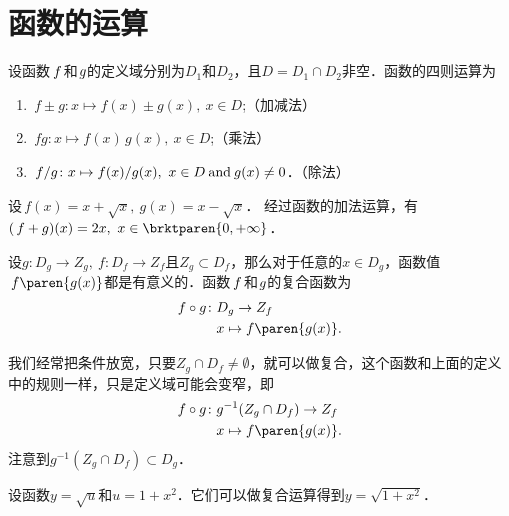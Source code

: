 \section{函数的运算\label{sec:funcops}}

\begin{definition}
  \label{defn:func4ops}
  设函数\(\,f\mkern2mu\)和\(\mkern1mu g\)的定义域分别为\(D_1\)和\(D_2\)，且\(D = D_1 \cap D_2\)非空．函数的四则运算为
  \begin{enumerate}
    \renewcommand{\labelenumi}{\enumparen{\arabic{enumi}}}
  \item \(\,f \pm g\colon x \mapsto f(x) \pm g(x),\ x \in D\);\hfill（加减法）
  \item \(\,fg\colon x \mapsto f(x) \, g(x),\ x \in D\);\hfill（乘法）
  \item \(\,f/g\colon x \mapsto f(x) / g(x),\ x \in D \mathbin{\text{and}} g(x) \ne 0\)．\hfill（除法）
  \end{enumerate}
\end{definition}

\begin{example*}
  设\(\,f(x) = x + \sqrt x,\ g(x) = x - \sqrt x\)．
  经过函数的加法运算，有\((\,f+g)(x) = 2x,\ x \in \brktparen{0, +\infty}\)．
\end{example*}

\begin{definition*}
  设\(g\colon D_g \to Z_g,\ f\colon D_f \to Z_f\)且\(Z_g \subset D_f\)，那么对于任意的\(x \in D_g\)，函数值\(\,f\paren{g(x)}\)都是有意义的．函数\(\,f\mkern2mu\)和\(\mkern1mu g\)的复合函数为
  \[
    \begin{split}
      f \circ g\colon & D_g \to Z_f \\
      & x \mapsto f\paren{g(x)}.
    \end{split}
  \]

  \begin{remark}
    我们经常把条件放宽，只要\(Z_g \cap D_f \ne \emptyset\)，就可以做复合，这个函数和上面的定义中的规则一样，只是定义域可能会变窄，即
    \[
      \begin{split}
        f \circ g\colon & g^{-1}(Z_g \cap D_f) \to Z_f \\
        & x \mapsto f\paren{g(x)}.
      \end{split}
    \]
    注意到\(g^{-1}(Z_g \cap D_f) \subset D_g\)．
  \end{remark}
\end{definition*}

\begin{example*}
  设函数\(y = \sqrt u\)和\(u = 1+x^2\)．它们可以做复合运算得到\(y = \sqrt{1+x^2}\)．
\end{example*}

